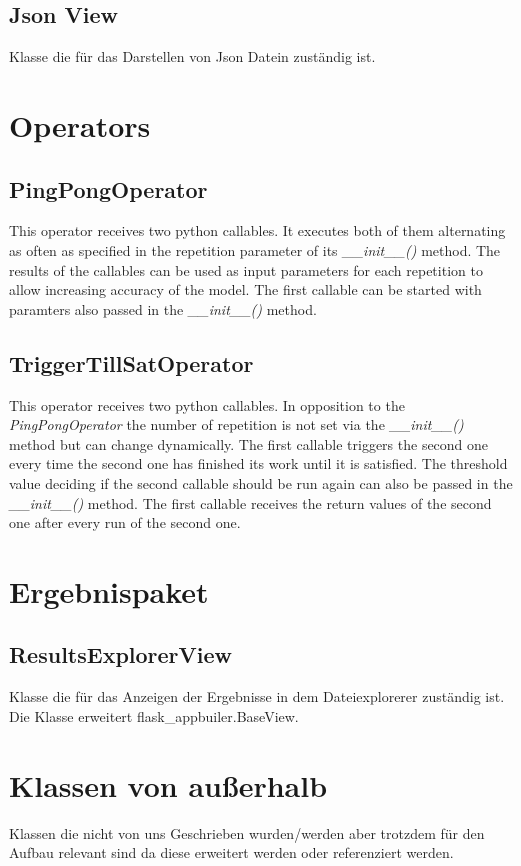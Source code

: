 \subsection{Json View}
Klasse die für das Darstellen von Json Datein zuständig ist.

\section{Operators}
\subsection{PingPongOperator}
This operator receives two python callables. It executes both of them alternating as often as specified in the repetition parameter of its \textit{\_\_init\_\_()} method. The results of the callables can be used as input parameters for each repetition to allow increasing accuracy of the model. The first callable can be started with paramters also passed in the \textit{\_\_init\_\_()} method.


\subsection{TriggerTillSatOperator}
This operator receives two python callables. In opposition to the \textit{PingPongOperator} the number of repetition is not set via the \textit{\_\_init\_\_()} method but can change dynamically. The first callable triggers the second one every time the second one has finished its work until it is satisfied. The threshold value deciding if the second callable should be run again can also be passed in the \textit{\_\_init\_\_()} method. The first callable receives the return values of the second one after every run of the second one.


\section{Ergebnispaket}
\subsection{ResultsExplorerView}
Klasse die für das Anzeigen der Ergebnisse in dem Dateiexplorerer zuständig ist.
Die Klasse erweitert flask\_appbuiler.BaseView.


\section{Klassen von außerhalb} %
Klassen die nicht von uns Geschrieben wurden/werden aber trotzdem für den Aufbau relevant sind da diese erweitert werden oder referenziert werden.

